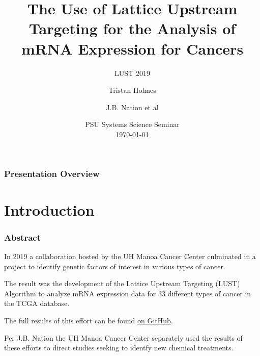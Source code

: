 \documentclass[
	11pt, %
]{beamer}
\title[LUST 2019]{The Use of Lattice Upstream Targeting for the Analysis of mRNA Expression for Cancers} %
\subtitle{LUST 2019} %
\author[Holmes \and Nation et al]{Tristan Holmes \and J.B. Nation et al} %
\institute[UH]{University of Hawaii at Manoa \\ \smallskip \textit{tristanh314@gmail.com}} %
\date[\today]{PSU Systems Science Seminar\\ \today} %
\begin{document}

\begin{frame}
	\titlepage
\end{frame}



\begin{frame}
	\frametitle{Presentation Overview}
	
	\tableofcontents
\end{frame}


\section{Introduction} 

\begin{frame}
	\frametitle{Abstract}
	
	In 2019 a collaboration hosted by the UH Manoa Cancer Center culminated in a project to identify genetic factors of interest in various types of cancer.
	\pause
	\bigskip 

	The result was the development of the Lattice Upstream Targeting (LUST) Algorithm to analyze mRNA expression data for 33 different types of cancer in the TCGA database.
	\pause
    \bigskip

    The full results of this effort can be found \href{https://github.com/tristanh314/lust-cancer-2019}{on GitHub}.
    \pause
	\bigskip 

    Per J.B. Nation the UH Manoa Cancer Center separately used the results of these efforts to direct studies seeking to identfy new chemical treatments.
\end{frame}
\end{document}
